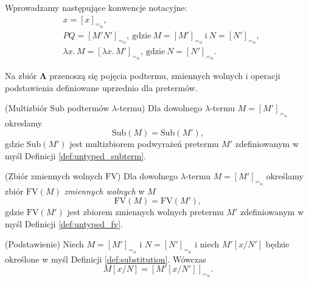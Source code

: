 \begin{konwencja*}
Wprowadzamy następujące konwencje notacyjne:
\begin{align*}
  &x = [x]_{=_\alpha},\\
  &PQ = [M'N']_{=_\alpha},\ \text{gdzie}\ M=[M']_{=_\alpha}\ \text{i}\ N=[N']_{=_\alpha},\\
  &\lambda x.\,M =  [\lambda x.\,M']_{=_\alpha},\  \text{gdzie}\ N=[N']_{=_\alpha}.
\end{align*}
\end{konwencja*}


Na zbiór \(\mathbf{\Lambda}\) przenoszą się pojęcia podtermu, zmiennych wolnych i operacji podstawienia definiowane uprzednio dla pretermów.

\begin{definicja}(Multizbiór \(\mathrm{Sub}\) podtermów \(\lambda\)-termu)
  Dla dowolnego \(\lambda\)-termu \(M=[M']_{=_{\alpha}}\) okreslamy
  \[
    \mathrm{Sub}(M)=\mathrm{Sub}(M'),
  \]
  gdzie \(\mathrm{Sub}(M')\) jest multizbiorem podwyrażeń pretermu \(M'\) zdefiniowanym w myśl Definicji \ref{def:untyped_subterm}.
\end{definicja}

\begin{definicja}(Zbiór zmiennych wolnych \(\mathrm{FV}\))
  Dla dowolnego \(\lambda\)-termu \(M=[M']_{=_{\alpha}}\) określamy zbiór \(\mathrm{FV}(M)\) \emph{zmiennych wolnych} w \(M\)
  \[
    \mathrm{FV}(M)=\mathrm{FV}(M'),
  \]
  gdzie \(\mathrm{FV}(M')\) jest zbiorem zmiennych wolnych pretermu \(M'\) zdefiniowanym w myśl Definicji \ref{def:untyped_fv}.
\end{definicja}

\begin{definicja}(Podstawienie)\label{def:untyped_lambda_substitution}
  Niech \(M=[M']_{=_\alpha}\) i \(N=[N']_{=_\alpha}\) i niech \(M'[x/N']\) będzie określone w myśl Definicji \ref{def:substitution}. Wówczas
  \[
    M[x/N]= [M'[x/N']]_{=_\alpha}.
  \]
\end{definicja}

